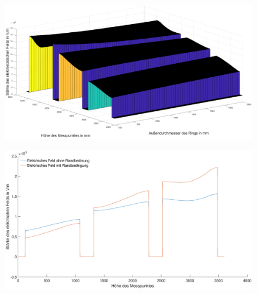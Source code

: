 \begin{figure}[h]
	\centering
	\includegraphics[width=\textwidth]{data/3DEtang}
\end{figure}

\begin{figure}[h]
	\centering
	\includegraphics[width=\textwidth]{data/VergleichRandbedingung}
\end{figure}